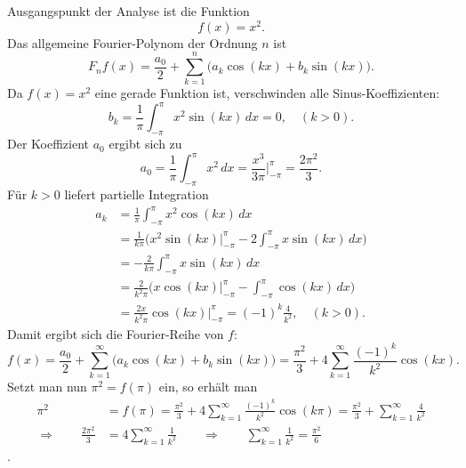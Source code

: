 

Ausgangspunkt der Analyse ist die Funktion
\[
f(x) = x^2.
\]
Das allgemeine Fourier-Polynom der Ordnung $n$ ist
\[
F_n f(x)
=
\frac{a_0}{2}
+
\sum_{k=1}^{n}
\bigl(
a_k \cos(kx) + b_k \sin(kx)
\bigr).
\]
Da $f(x) = x^2$ eine gerade Funktion ist, verschwinden alle Sinus-Koeffizienten:
\[
b_k
=
\frac{1}{\pi}
\int_{-\pi}^{\pi} x^2 \sin(kx)\, dx
=
0,
\quad (k > 0).
\]
Der Koeffizient $a_0$ ergibt sich zu
\[
a_0
=
\frac{1}{\pi}
\int_{-\pi}^{\pi} x^2\, dx
=
\frac{x^3}{3\pi}
\bigg|_{-\pi}^{\pi}
=
\frac{2\pi^2}{3}.
\]
Für $k > 0$ liefert partielle Integration
\begin{align*}
a_k
&=
\frac{1}{\pi}
\int_{-\pi}^{\pi} x^2 \cos(kx)\, dx
\\
&=
\frac{1}{k\pi}
\biggl(
x^2 \sin(kx)
\bigg|_{-\pi}^{\pi}
-
2 \int_{-\pi}^{\pi} x \sin(kx)\, dx
\biggr)
\\
&=
-\frac{2}{k\pi}
\int_{-\pi}^{\pi} x \sin(kx)\, dx
\\
&=
\frac{2}{k^2\pi}
\biggl(
x \cos(kx)
\bigg|_{-\pi}^{\pi}
-
\int_{-\pi}^{\pi} \cos(kx)\, dx
\biggr)
\\
&=
\frac{2x}{k^2\pi} \cos(kx)
\bigg|_{-\pi}^{\pi}
=
(-1)^k \frac{4}{k^2},
\quad (k > 0).
\end{align*}
Damit ergibt sich die Fourier-Reihe von $f$:
\[
f(x)
=
\frac{a_0}{2}
+
\sum_{k=1}^{\infty}
\bigl(
a_k \cos(kx) + b_k \sin(kx)
\bigr)
=
\frac{\pi^2}{3}
+
4 \sum_{k=1}^{\infty} \frac{(-1)^k}{k^2} \cos(kx).
\]
Setzt man nun $\pi^2 = f(\pi)$ ein, so erhält man
\begin{align*}
\pi^2
&=
f(\pi)
=
\frac{\pi^2}{3}
+
4 \sum_{k=1}^{\infty} \frac{(-1)^k}{k^2} \cos(k\pi)
=
\frac{\pi^2}{3}
+
\sum_{k=1}^{\infty} \frac{4}{k^2}
\\
\Rightarrow\qquad
\frac{2\pi^2}{3}
&=
4\sum_{k=1}^{\infty} \frac{1}{k^2}
\qquad\Rightarrow\qquad
\sum_{k=1}^{\infty} \frac{1}{k^2}
=
\frac{\pi^2}{6}
\end{align*}
\cite{basel:math.fandom.com}.
